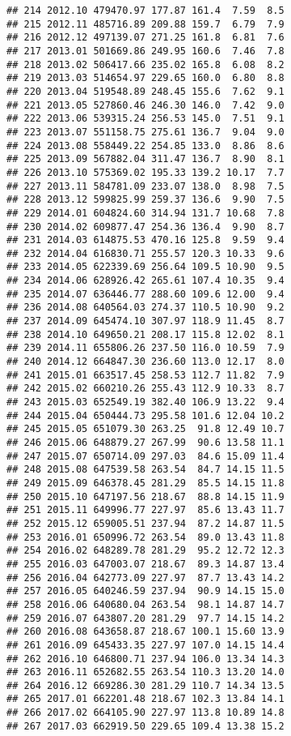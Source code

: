 \documentclass[]{article}
\begin{document}
\begin{verbatim}
## 214 2012.10 479470.97 177.87 161.4  7.59  8.5
## 215 2012.11 485716.89 209.88 159.7  6.79  7.9
## 216 2012.12 497139.07 271.25 161.8  6.81  7.6
## 217 2013.01 501669.86 249.95 160.6  7.46  7.8
## 218 2013.02 506417.66 235.02 165.8  6.08  8.2
## 219 2013.03 514654.97 229.65 160.0  6.80  8.8
## 220 2013.04 519548.89 248.45 155.6  7.62  9.1
## 221 2013.05 527860.46 246.30 146.0  7.42  9.0
## 222 2013.06 539315.24 256.53 145.0  7.51  9.1
## 223 2013.07 551158.75 275.61 136.7  9.04  9.0
## 224 2013.08 558449.22 254.85 133.0  8.86  8.6
## 225 2013.09 567882.04 311.47 136.7  8.90  8.1
## 226 2013.10 575369.02 195.33 139.2 10.17  7.7
## 227 2013.11 584781.09 233.07 138.0  8.98  7.5
## 228 2013.12 599825.99 259.37 136.6  9.90  7.5
## 229 2014.01 604824.60 314.94 131.7 10.68  7.8
## 230 2014.02 609877.47 254.36 136.4  9.90  8.7
## 231 2014.03 614875.53 470.16 125.8  9.59  9.4
## 232 2014.04 616830.71 255.57 120.3 10.33  9.6
## 233 2014.05 622339.69 256.64 109.5 10.90  9.5
## 234 2014.06 628926.42 265.61 107.4 10.35  9.4
## 235 2014.07 636446.77 288.60 109.6 12.00  9.4
## 236 2014.08 640564.03 274.37 110.5 10.90  9.2
## 237 2014.09 645474.10 307.97 118.9 11.45  8.7
## 238 2014.10 649650.21 208.17 115.8 12.02  8.1
## 239 2014.11 655806.26 237.50 116.0 10.59  7.9
## 240 2014.12 664847.30 236.60 113.0 12.17  8.0
## 241 2015.01 663517.45 258.53 112.7 11.82  7.9
## 242 2015.02 660210.26 255.43 112.9 10.33  8.7
## 243 2015.03 652549.19 382.40 106.9 13.22  9.4
## 244 2015.04 650444.73 295.58 101.6 12.04 10.2
## 245 2015.05 651079.30 263.25  91.8 12.49 10.7
## 246 2015.06 648879.27 267.99  90.6 13.58 11.1
## 247 2015.07 650714.09 297.03  84.6 15.09 11.4
## 248 2015.08 647539.58 263.54  84.7 14.15 11.5
## 249 2015.09 646378.45 281.29  85.5 14.15 11.8
## 250 2015.10 647197.56 218.67  88.8 14.15 11.9
## 251 2015.11 649996.77 227.97  85.6 13.43 11.7
## 252 2015.12 659005.51 237.94  87.2 14.87 11.5
## 253 2016.01 650996.72 263.54  89.0 13.43 11.8
## 254 2016.02 648289.78 281.29  95.2 12.72 12.3
## 255 2016.03 647003.07 218.67  89.3 14.87 13.4
## 256 2016.04 642773.09 227.97  87.7 13.43 14.2
## 257 2016.05 640246.59 237.94  90.9 14.15 15.0
## 258 2016.06 640680.04 263.54  98.1 14.87 14.7
## 259 2016.07 643807.20 281.29  97.7 14.15 14.2
## 260 2016.08 643658.87 218.67 100.1 15.60 13.9
## 261 2016.09 645433.35 227.97 107.0 14.15 14.4
## 262 2016.10 646800.71 237.94 106.0 13.34 14.3
## 263 2016.11 652682.55 263.54 110.3 13.20 14.0
## 264 2016.12 669286.30 281.29 110.7 14.34 13.5
## 265 2017.01 662201.48 218.67 102.3 13.84 14.1
## 266 2017.02 664105.90 227.97 113.8 10.89 14.8
## 267 2017.03 662919.50 229.65 109.4 13.38 15.2

\end{verbatim}
\end{document}
